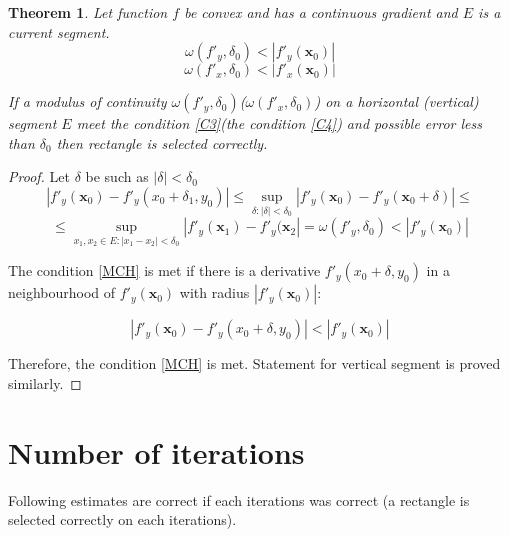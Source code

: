 \documentclass[12pt]{article}
\newtheorem{theorem}{Theorem}[section]
\begin{document}
\begin{theorem}
Let function $f$ be convex and has a continuous gradient and $E$ is a current segment. 
\begin{equation}\label{C3}\omega(f'_y, \delta_0) < |f'_y(\textbf{x}_0)|\end{equation}
\begin{equation}\label{C4}\omega(f'_x, \delta_0) < |f'_x(\textbf{x}_0)|\end{equation}

If a modulus of continuity $\omega(f'_y, \delta_0)$($\omega(f'_x, \delta_0)$) on a horizontal (vertical) segment $E$ meet the condition \eqref{C3}(the condition \eqref{C4}) and possible error less than $\delta_0$ then rectangle is selected correctly.
\end{theorem}
\begin{proof}
Let $\delta$ be such as $|\delta|<\delta_0$
$$\left|f'_y(\textbf{x}_0) - f'_y(x_0+\delta_1, y_0)\right| \leq \sup_{\delta : |\delta|<\delta_0}|f'_y(\textbf{x}_0) - f'_y(\textbf{x}_0 + \delta)|\leq$$
$$ \leq \sup_{x_1, x_2 \in E : |x_1 - x_2|<\delta_0}|f'_y(\textbf{x}_1) - f'_y(\textbf{x}_2 |= \omega(f'_y, \delta_0) < |f'_y(\textbf{x}_0)|$$

The condition \eqref{MCH} is met if there is a derivative $f'_y(x_0+\delta, y_0)$ in a neighbourhood of 
$f'_y(\textbf{x}_0)$ with radius $\left|f'_y(\textbf{x}_0)\right|$:

$$\left|f'_y(\textbf{x}_0) - f'_y(x_0+\delta, y_0)\right|<\left|f'_y(\textbf{x}_0)\right|$$

Therefore, the condition \eqref{MCH} is met. Statement for vertical segment is proved similarly.
\end{proof}

\section{Number of iterations}

Following estimates are correct if each iterations was correct (a rectangle is selected correctly on each iterations).
\end{document}
